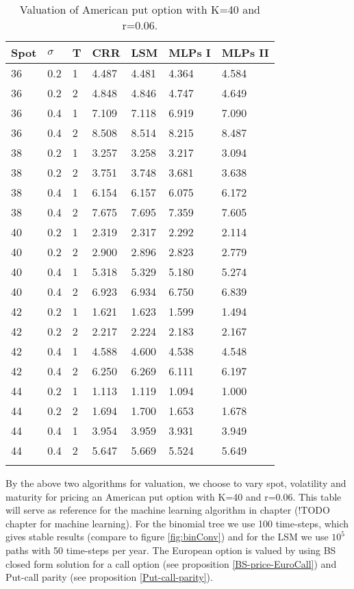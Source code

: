 \begin{table}[th]
\caption{Valuation of American put option with K=40 and r=0.06.}
\label{tab:treatments}
\centering
\begin{tabular}{l l l l l l l }
\toprule
\textbf{Spot} & \textbf{$\sigma$} & \textbf{T} & \textbf{CRR} & \textbf{LSM} & \textbf{MLPs I} & \textbf{MLPs II} \\
\midrule
36 & 0.2 & 1 & 4.487 & 4.481 & 4.364 & 4.584\\
36 & 0.2 & 2 & 4.848 & 4.846 & 4.747 & 4.649\\
36 & 0.4 & 1 & 7.109 & 7.118 & 6.919 & 7.090\\
36 & 0.4 & 2 & 8.508 & 8.514 & 8.215 & 8.487\\
38 & 0.2 & 1 & 3.257 & 3.258 & 3.217 & 3.094\\
38 & 0.2 & 2 & 3.751 & 3.748 & 3.681 & 3.638\\
38 & 0.4 & 1 & 6.154 & 6.157 & 6.075 & 6.172\\
38 & 0.4 & 2 & 7.675 & 7.695 & 7.359 & 7.605\\
40 & 0.2 & 1 & 2.319 & 2.317 & 2.292 & 2.114\\
40 & 0.2 & 2 & 2.900 & 2.896 & 2.823 & 2.779\\
40 & 0.4 & 1 & 5.318 & 5.329 & 5.180 & 5.274\\
40 & 0.4 & 2 & 6.923 & 6.934 & 6.750 & 6.839\\
42 & 0.2 & 1 & 1.621 & 1.623 & 1.599 & 1.494\\
42 & 0.2 & 2 & 2.217 & 2.224 & 2.183 & 2.167\\
42 & 0.4 & 1 & 4.588 & 4.600 & 4.538 & 4.548\\
42 & 0.4 & 2 & 6.250 & 6.269 & 6.111 & 6.197\\
44 & 0.2 & 1 & 1.113 & 1.119 & 1.094 & 1.000\\
44 & 0.2 & 2 & 1.694 & 1.700 & 1.653 & 1.678\\
44 & 0.4 & 1 & 3.954 & 3.959 & 3.931 & 3.949\\
44 & 0.4 & 2 & 5.647 & 5.669 & 5.524 & 5.649\\
\bottomrule\\
\end{tabular}
\end{table}


By the above two algorithms for valuation, we choose to vary spot, volatility and maturity for pricing an American put option with K=40 and r=0.06. This table will serve as reference for the machine learning algorithm in chapter (!TODO chapter for machine learning). For the binomial tree we use 100 time-steps, which gives stable results (compare to figure \ref{fig:binConv}) and for the LSM we use $10^5$ paths with 50 time-steps per year. The European option is valued by using BS closed form solution for a call option (see proposition \ref{BS-price-EuroCall}) and Put-call parity (see proposition \ref{Put-call-parity}).

